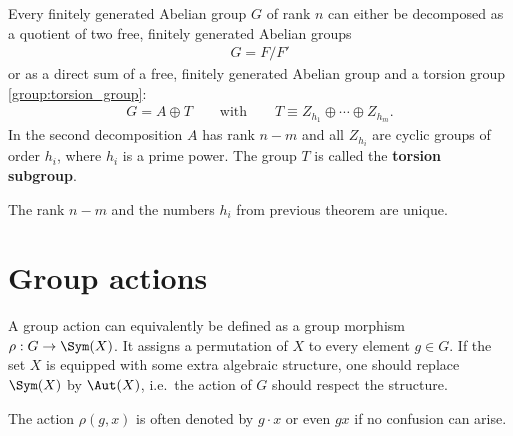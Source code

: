     \begin{theorem}\label{group:theorem:free_group}
        Every finitely generated Abelian group $G$ of rank $n$ can either be decomposed as a quotient of two free, finitely generated Abelian groups
        \begin{gather}
            G = F/F'
        \end{gather}
        or as a direct sum of a free, finitely generated Abelian group and a torsion group \ref{group:torsion_group}:
        \begin{gather}
            G = A\oplus T \qquad\text{with}\qquad T\equiv Z_{h_1}\oplus\cdots\oplus Z_{h_m}.
        \end{gather}
        In the second decomposition $A$ has rank $n-m$ and all $Z_{h_i}$ are cyclic groups of order $h_i$, where $h_i$ is a prime power. The group $T$ is called the \textbf{torsion subgroup}.
    \end{theorem}
    \begin{property}[Uniqueness]
        The rank $n-m$ and the numbers $h_i$ from previous theorem are unique.
    \end{property}

\section{Group actions}\label{section:group_actions}

    \begin{adefinition}\label{group:permutation_remark}
        A group action can equivalently be defined as a group morphism $\rho:G\rightarrow\Sym(X)$. It assigns a permutation of $X$ to every element $g\in G$. If the set $X$ is equipped with some extra algebraic structure, one should replace $\Sym(X)$ by $\Aut(X)$, i.e.~the action of $G$ should respect the structure.
    \end{adefinition}
    \begin{notation}
        The action $\rho(g,x)$ is often denoted by $g\cdot x$ or even $gx$ if no confusion can arise.
    \end{notation}

